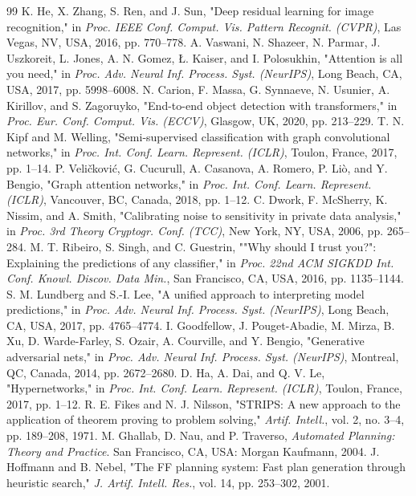 \documentclass[conference]{IEEEtran}
\begin{document}
\begin{thebibliography}{99}
K. He, X. Zhang, S. Ren, and J. Sun, "Deep residual learning for image recognition," in \textit{Proc. IEEE Conf. Comput. Vis. Pattern Recognit. (CVPR)}, Las Vegas, NV, USA, 2016, pp. 770–778.
A. Vaswani, N. Shazeer, N. Parmar, J. Uszkoreit, L. Jones, A. N. Gomez, Ł. Kaiser, and I. Polosukhin, "Attention is all you need," in \textit{Proc. Adv. Neural Inf. Process. Syst. (NeurIPS)}, Long Beach, CA, USA, 2017, pp. 5998–6008.
N. Carion, F. Massa, G. Synnaeve, N. Usunier, A. Kirillov, and S. Zagoruyko, "End-to-end object detection with transformers," in \textit{Proc. Eur. Conf. Comput. Vis. (ECCV)}, Glasgow, UK, 2020, pp. 213–229.
T. N. Kipf and M. Welling, "Semi-supervised classification with graph convolutional networks," in \textit{Proc. Int. Conf. Learn. Represent. (ICLR)}, Toulon, France, 2017, pp. 1–14.
P. Veličković, G. Cucurull, A. Casanova, A. Romero, P. Liò, and Y. Bengio, "Graph attention networks," in \textit{Proc. Int. Conf. Learn. Represent. (ICLR)}, Vancouver, BC, Canada, 2018, pp. 1–12.
C. Dwork, F. McSherry, K. Nissim, and A. Smith, "Calibrating noise to sensitivity in private data analysis," in \textit{Proc. 3rd Theory Cryptogr. Conf. (TCC)}, New York, NY, USA, 2006, pp. 265–284.
M. T. Ribeiro, S. Singh, and C. Guestrin, ""Why should I trust you?": Explaining the predictions of any classifier," in \textit{Proc. 22nd ACM SIGKDD Int. Conf. Knowl. Discov. Data Min.}, San Francisco, CA, USA, 2016, pp. 1135–1144.
S. M. Lundberg and S.-I. Lee, "A unified approach to interpreting model predictions," in \textit{Proc. Adv. Neural Inf. Process. Syst. (NeurIPS)}, Long Beach, CA, USA, 2017, pp. 4765–4774.
I. Goodfellow, J. Pouget-Abadie, M. Mirza, B. Xu, D. Warde-Farley, S. Ozair, A. Courville, and Y. Bengio, "Generative adversarial nets," in \textit{Proc. Adv. Neural Inf. Process. Syst. (NeurIPS)}, Montreal, QC, Canada, 2014, pp. 2672–2680.
D. Ha, A. Dai, and Q. V. Le, "Hypernetworks," in \textit{Proc. Int. Conf. Learn. Represent. (ICLR)}, Toulon, France, 2017, pp. 1–12.
R. E. Fikes and N. J. Nilsson, "STRIPS: A new approach to the application of theorem proving to problem solving," \textit{Artif. Intell.}, vol. 2, no. 3–4, pp. 189–208, 1971.
M. Ghallab, D. Nau, and P. Traverso, \textit{Automated Planning: Theory and Practice}. San Francisco, CA, USA: Morgan Kaufmann, 2004.
J. Hoffmann and B. Nebel, "The FF planning system: Fast plan generation through heuristic search," \textit{J. Artif. Intell. Res.}, vol. 14, pp. 253–302, 2001.

\end{thebibliography}
\end{document}
